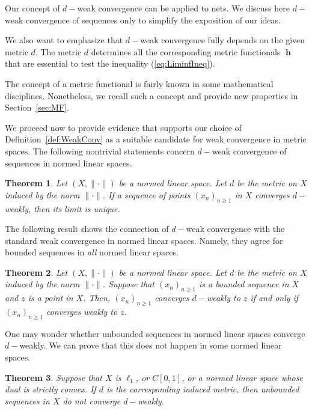 \documentclass[a4paper,12pt]{article}
\newtheorem{thm}{Theorem}[section]
\theoremstyle{definition}
\DeclareMathOperator{\h}{\mathbf{h}}
\newcommand{\norm}[1]{\lVert#1\rVert}
\numberwithin{equation}{section}
\begin{document}
Our concept of $d-$weak convergence can be applied to nets. We discuss here
$d-$weak convergence of sequences only to simplify the exposition of our ideas.
 
We also want to emphasize that $d-$weak convergence fully depends on the given 
metric $d$. The metric $d$ determines all the corresponding metric 
functionals $\h$ that are essential to test the inequality (\ref{eq:LiminfIneq}). 

The concept of a metric functional is fairly known in some mathematical 
disciplines. Nonetheless, we recall such a concept and provide new properties in 
Section~\ref{sec:MF}.

We proceed now to provide evidence that supports our choice of 
Definition~\ref{def:WeakConv} as a suitable candidate for weak convergence in 
metric spaces. The following nontrivial statements concern $d-$weak convergence
of sequences in normed linear spaces.

\begin{thm}\label{thm:unique}
Let $(X,\norm{\cdot})$ be a normed linear space. Let $d$ be the metric on $X$ 
induced by the norm $\norm{\cdot}$. If a sequence of points $(x_n)_{n\geq 1}$ 
in $X$ converges $d-$weakly, then its limit is unique.
\end{thm}

The following result shows the connection of $d-$weak convergence with the standard 
weak convergence in normed linear spaces. Namely, they agree for bounded 
sequences in \emph{all} normed linear spaces.

\begin{thm}\label{thm:dWeakANDstWeak}
Let $(X,\norm{\cdot})$ be a normed linear space. Let $d$ be the metric on $X$ 
induced by the norm $\norm{\cdot}$. Suppose that $(x_n)_{n\geq 1}$ is a bounded 
sequence in $X$ and $z$ is a point in $X$. Then, $(x_n)_{n\geq 1}$ converges 
$d-$weakly to $z$ if and only if $(x_n)_{n\geq 1}$ converges weakly to $z$.
\end{thm}

One may wonder whether unbounded sequences in normed linear spaces converge 
$d-$weakly. We can prove that this does not happen in some normed linear spaces.

\begin{thm}\label{thm:UnbNoWeak}
Suppose that $X$ is $\ell_1$, or $C[0,1]$, or a normed linear space whose dual 
is strictly convex. If $d$ is the corresponding induced metric, then unbounded 
sequences in $X$ do not converge $d-$weakly.
\end{thm}
\end{document}
